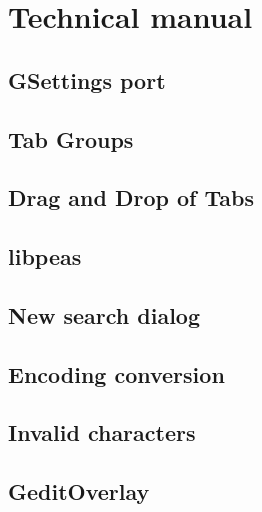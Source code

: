 \documentclass[a4paper,11pt,twoside]{book}
\begin{document}
\part{Technical manual}


\chapter{GSettings port}
\chapter{Tab Groups}
\chapter{Drag and Drop of Tabs}
\chapter{libpeas}
\chapter{New search dialog}
\chapter{Encoding conversion}
\chapter{Invalid characters}
\chapter{GeditOverlay}

\nocite{*}


\end{document}
